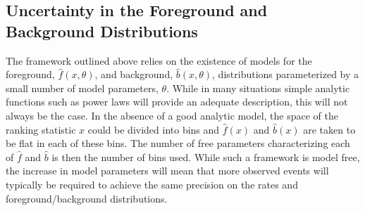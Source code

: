 \documentclass[aps,prd,reprint,nofootinbib]{revtex4-1}
\begin{document}
\subsection{Uncertainty in the Foreground and Background Distributions}
\label{sec:uncertain-dist}
The framework outlined above relies on the existence of models for the foreground, $\hat{f}(x,\theta)$, and background, $\hat{b}(x,\theta)$, distributions parameterized by a small number of model parameters, $\theta$. While in many situations simple analytic functions such as power laws will provide an adequate description, this will not always be the case. In the absence of a good analytic model, the space of the ranking statistic $x$ could be divided into bins and $\hat{f}(x)$ and $\hat{b}(x)$ are taken to be flat in each of these bins. The number of free parameters characterizing each of $\hat{f}$ and $\hat{b}$ is then the number of bins used. While such a framework is model free, the increase in model parameters will mean that more observed events will typically be required to achieve the same precision on the rates and foreground/background distributions.
\end{document}
